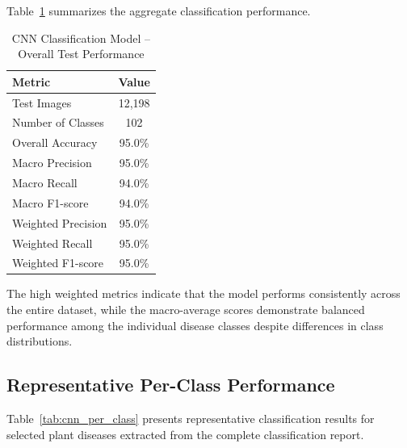 Table~\ref{tab:cnn_metrics} summarizes the aggregate classification performance.

\begin{table}[H]
\centering
\caption{CNN Classification Model -- Overall Test Performance}
\label{tab:cnn_metrics}
\renewcommand{\arraystretch}{1.4}
\begin{tabular}{lc}
\toprule
\textbf{Metric} & \textbf{Value} \\
\midrule
Test Images & 12,198 \\
Number of Classes & 102 \\
Overall Accuracy & 95.0\% \\
Macro Precision & 95.0\% \\
Macro Recall & 94.0\% \\
Macro F1-score & 94.0\% \\
Weighted Precision & 95.0\% \\
Weighted Recall & 95.0\% \\
Weighted F1-score & 95.0\% \\
\bottomrule
\end{tabular}
\end{table}

The high weighted metrics indicate that the model performs consistently across the entire dataset, while the macro-average scores demonstrate balanced performance among the individual disease classes despite differences in class distributions.

\subsection{Representative Per-Class Performance}
\label{subsec:cnn_per_class}

Table~\ref{tab:cnn_per_class} presents representative classification results for selected plant diseases extracted from the complete classification report.

